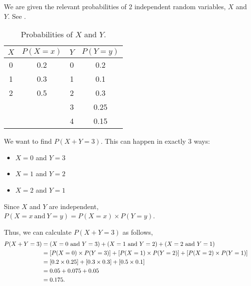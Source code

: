 \begin{subquestions}
\subquestion

We are given the relevant probabilities of 2 independent random variables, $X$ and $Y$. See .
\begin{table}[ht]
	\centering
	\begin{tabular}{|c|c|c|c|}
		\hline
		$X$ & $P(X=x)$ & $Y$ & $P(Y=y)$ \\
		\hline
		0 & 0.2 & 0 & 0.2 \\
		1 & 0.3 & 1 & 0.1 \\
		2 & 0.5 & 2 & 0.3 \\
		  &     & 3 & 0.25 \\
		  &     & 4 & 0.15 \\
		  \hline
	\end{tabular}
	\caption{\label{2014:q4:Tab1} Probabilities of $X$ and $Y$.}
\end{table}

\begin{subsubquestions} 

\subsubquestion

We want to find $P(X+Y=3)$. This can happen in exactly 3 ways:
\begin{itemize}
	\item $X = 0$ and $Y = 3$
	\item $X = 1$ and $Y = 2$
	\item $X = 2$ and $Y = 1$
\end{itemize}

Since $X$ and $Y$ are independent, $P(X=x ~\text{and}~ Y=y) = P(X=x) \times P(Y=y)$.

Thus, we can calculate $P(X+Y=3)$ as follows,
\begin{align}
	P(X+Y=3) & = (X=0 ~\text{and}~ Y=3) + (X=1 ~\text{and}~ Y=2) + (X=2 ~\text{and}~ Y=1) \nonumber \\
	         & = [P(X=0) \times P(Y=3)] + [P(X=1) \times P(Y=2)] + [P(X=2) \times P(Y=1)] \nonumber \\
	         & = [0.2 \times 0.25] + [0.3 \times 0.3] + [0.5 \times 0.1] \nonumber \\ 
	         & = 0.05 + 0.075+0.05 \nonumber \\
	         & = 0.175.
\end{align}


	
\end{subsubquestions}

\end{subquestions}

